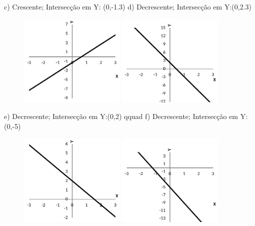 \begin{respostas}{3}
c) Crescente; Intersecção em Y: (0,-1.3) \qquad d) Decrescente; Intersecção em Y:(0,2.3)

\begin{figure}[H]
	\includegraphics[width=0.45\textwidth]{capitulos/funcao_do_primeiro_grau/media/image59.pdf} 
	\includegraphics[width=0.45\textwidth]{capitulos/funcao_do_primeiro_grau/media/image60.pdf}
\end{figure}

e) Decrescente; Intersecção em Y:(0,2) qquad f) Decrescente; Intersecção em Y:(0,-5)

\begin{figure}[H]
	\includegraphics[width=0.45\textwidth]{capitulos/funcao_do_primeiro_grau/media/image61.pdf} 
	\includegraphics[width=0.45\textwidth]{capitulos/funcao_do_primeiro_grau/media/image62.pdf}
\end{figure}


\end{respostas}
